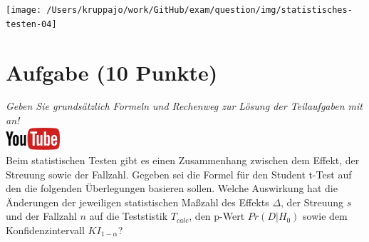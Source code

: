 \documentclass[a4paper, 9pt]{scrartcl}\usepackage[]{graphicx}\usepackage[]{xcolor}
\begin{document}
\begin{center}
  \texttt{[image: /Users/kruppajo/work/GitHub/exam/question/img/statistisches-testen-04]}
\end{center}


 
\clearpage

\section{Aufgabe \hfill (10 Punkte)}

\textit{Geben Sie grunds{\"a}tzlich Formeln und Rechenweg zur L{\"o}sung der
  Teilaufgaben mit an!} \\[1Ex]

\hfill\href{https://youtu.be/FgZmpnEWDag}{\includegraphics[width =
  2cm]{img/youtube}}\\[1Ex]



Beim statistischen Testen gibt es einen Zusammenhang zwischen dem Effekt,
der Streuung sowie der Fallzahl. Gegeben sei die Formel f{\"u}r den Student
t-Test auf den die folgenden {\"U}berlegungen basieren sollen. Welche
Auswirkung hat die {\"A}nderungen der jeweiligen statistischen Ma{\ss}zahl des
Effekts $\Delta$, der Streuung $s$ und der Fallzahl $n$ auf die Teststistik
$T_{calc}$, den p-Wert $Pr(D|H_0)$ sowie dem Konfidenzintervall
$KI_{1-\alpha}$?
\end{document}

